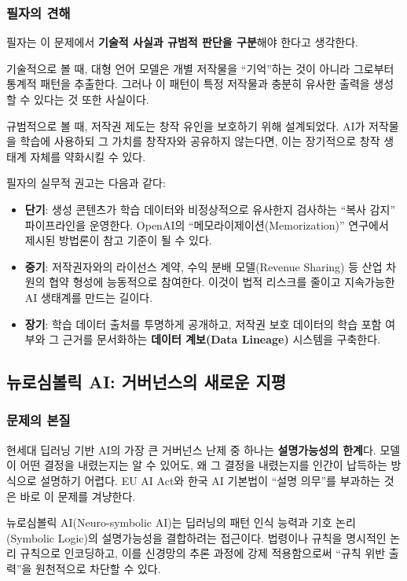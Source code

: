 \subsubsection*{필자의 견해}

필자는 이 문제에서 \textbf{기술적 사실과 규범적 판단을 구분}해야 한다고 생각한다.

기술적으로 볼 때, 대형 언어 모델은 개별 저작물을 ``기억''하는 것이 아니라 그로부터 통계적 패턴을 추출한다. 그러나 이 패턴이 특정 저작물과 충분히 유사한 출력을 생성할 수 있다는 것 또한 사실이다.

규범적으로 볼 때, 저작권 제도는 창작 유인을 보호하기 위해 설계되었다. AI가 저작물을 학습에 사용하되 그 가치를 창작자와 공유하지 않는다면, 이는 장기적으로 창작 생태계 자체를 약화시킬 수 있다.

필자의 실무적 권고는 다음과 같다:
\begin{itemize}
    \item \textbf{단기}: 생성 콘텐츠가 학습 데이터와 비정상적으로 유사한지 검사하는 ``복사 감지'' 파이프라인을 운영한다. OpenAI의 ``메모라이제이션(Memorization)'' 연구에서 제시된 방법론이 참고 기준이 될 수 있다.
    \item \textbf{중기}: 저작권자와의 라이선스 계약, 수익 분배 모델(Revenue Sharing) 등 산업 차원의 협약 형성에 능동적으로 참여한다. 이것이 법적 리스크를 줄이고 지속가능한 AI 생태계를 만드는 길이다.
    \item \textbf{장기}: 학습 데이터 출처를 투명하게 공개하고, 저작권 보호 데이터의 학습 포함 여부와 그 근거를 문서화하는 \textbf{데이터 계보(Data Lineage)} 시스템을 구축한다.
\end{itemize}

\subsection{뉴로심볼릭 AI: 거버넌스의 새로운 지평}
\label{sec:3.4.3}

\subsubsection*{문제의 본질}

현세대 딥러닝 기반 AI의 가장 큰 거버넌스 난제 중 하나는 \textbf{설명가능성의 한계}다. 모델이 어떤 결정을 내렸는지는 알 수 있어도, 왜 그 결정을 내렸는지를 인간이 납득하는 방식으로 설명하기 어렵다. EU AI Act와 한국 AI 기본법이 ``설명 의무''를 부과하는 것은 바로 이 문제를 겨냥한다.

뉴로심볼릭 AI(Neuro-symbolic AI)는 딥러닝의 패턴 인식 능력과 기호 논리(Symbolic Logic)의 설명가능성을 결합하려는 접근이다. 법령이나 규칙을 명시적인 논리 규칙으로 인코딩하고, 이를 신경망의 추론 과정에 강제 적용함으로써 ``규칙 위반 출력''을 원천적으로 차단할 수 있다.

